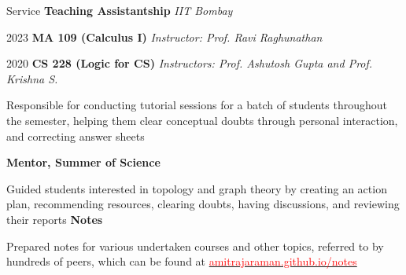 
\begin{rubric}{Service}
    \entry* \textbf{Teaching Assistantship} \hfill \emph{IIT Bombay}

       2023 \quad \textbf{MA 109 (Calculus I)} \hfill \emph{Instructor: Prof. Ravi Raghunathan}

       2020 \quad \textbf{CS 228 (Logic for CS)} \hfill  \emph{Instructors: Prof. Ashutosh Gupta and Prof. Krishna S.}

	    Responsible for conducting tutorial sessions for a batch of students throughout the semester, helping them clear conceptual doubts through personal interaction, and correcting answer sheets

	\entry*[2021--2022] \textbf{Mentor, Summer of Science}

		Guided students interested in topology and graph theory by creating an action plan, recommending resources, clearing doubts, having discussions, and reviewing their reports
	\entry*[2020--Present] \textbf{Notes}

		Prepared notes for various undertaken courses and other topics, referred to by hundreds of peers, which can be found at \href{https://amitrajaraman.github.io/notes}{\textcolor{red}{amitrajaraman.github.io/notes}}
\end{rubric}